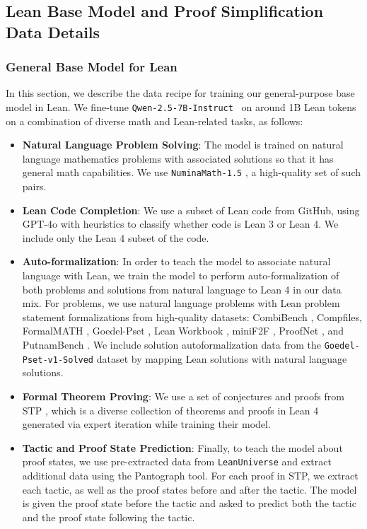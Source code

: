 \newpage
\subsection{Lean Base Model and Proof Simplification Data Details} \label{appendix:base-model-and-data}

\subsubsection{General Base Model for Lean} \label{subsec:lean-base-model}

In this section, we describe the data recipe for training our general-purpose base model in Lean. We fine-tune \texttt{Qwen-2.5-7B-Instruct}~\citep{qwen2} on around 1B Lean tokens on a combination of diverse math and Lean-related tasks, as follows:
\begin{itemize}
    \item \textbf{Natural Language Problem Solving}: The model is trained on natural language mathematics problems with associated solutions so that it has general math capabilities. We use \texttt{NuminaMath-1.5} \citep{numina_math_datasets}, a high-quality set of such pairs.
    \item \textbf{Lean Code Completion}: We use a subset of Lean code from GitHub, using GPT-4o with heuristics to classify whether code is Lean 3 or Lean 4. We include only the Lean 4 subset of the code.
    \item \textbf{Auto-formalization}: In order to teach the model to associate natural language with Lean, we train the model to perform auto-formalization of both problems and solutions from natural language to Lean 4 in our data mix. For problems, we use natural language problems with Lean problem statement formalizations from high-quality datasets: CombiBench \citep{liu2025combibench}, Compfiles, FormalMATH \citep{yu2025formalmath}, Goedel-Pset \citep{lin2025goedel}, Lean Workbook \citep{ying2024lean}, miniF2F \citep{zheng2021minif2f}, ProofNet \citep{azerbayev2023proofnet}, and PutnamBench \citep{tsoukalas2024putnambench}. We include solution autoformalization data from the \texttt{Goedel-Pset-v1-Solved} dataset by mapping Lean solutions with natural language solutions.
    \item \textbf{Formal Theorem Proving}: We use a set of conjectures and proofs from STP \citep{dong2025stp}, which is a diverse collection of theorems and proofs in Lean 4 generated via expert iteration while training their model.
    \item \textbf{Tactic and Proof State Prediction}: Finally, to teach the model about proof states, we use pre-extracted data from \texttt{LeanUniverse} \citep{ahm2025leanuniverse} and extract additional data using the Pantograph \citep{aniva2025pantograph} tool. For each proof in STP, we extract each tactic, as well as the proof states before and after the tactic. The model is given the proof state before the tactic and asked to predict both the tactic and the proof state following the tactic.
\end{itemize}

